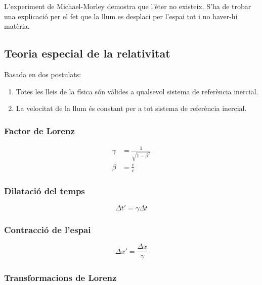 L'experiment de Michael-Morley demostra que l'èter no existeix. S'ha de trobar
una explicació per el fet que la llum es desplaci per l'espai tot i no haver-hi
matèria.

\subsection{Teoria especial de la relativitat}
\label{sub:teoria_especial_de_la_relativitat}

Basada en dos postulats:

\begin{enumerate}
    \item Totes les lleis de la física són vàlides a qualsevol sistema de
        referència inercial.
    \item La velocitat de la llum és constant per a tot sistema de referència
        inercial.
\end{enumerate}

\subsubsection{Factor de Lorenz}
\label{ssub:factor_de_lorenz}

\begin{align}
    \gamma &= \frac{1}{\sqrt{1 - \beta^2}} \\
    \beta &= \frac{v}{c}
\end{align}

\subsubsection{Dilatació del temps}
\label{ssub:dilatacio_del_temps}

\begin{equation}
    \Delta t' = \gamma  \Delta t
\end{equation}

\subsubsection{Contracció de l'espai}
\label{ssub:contracció_de_l_espai}

\begin{equation}
    \Delta x' = \frac{\Delta x}{\gamma}
\end{equation}

\subsubsection{Transformacions de Lorenz}
\label{ssub:transformacions_de_lorenz}

